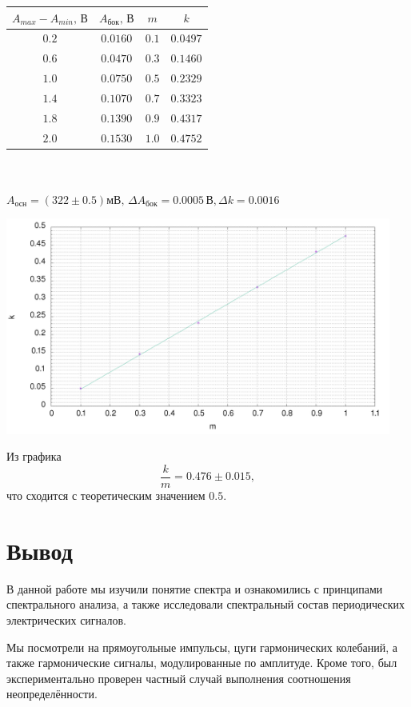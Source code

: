 \documentclass[a4paper, 12pt]{article}%
\begin{document}
\begin{center}
\begin{tabular}{|c|c|c|c|}\hline
$A_{max}-A_{min}\text{, В}$&$A_\text{бок}\text{, В}$&$m$&$k$\\\hline
$0.2$&$0.0160$&$0.1$&$0.0497$\\\hline
$0.6$&$0.0470$&$0.3$&$0.1460$\\\hline
$1.0$&$0.0750$&$0.5$&$0.2329$\\\hline
$1.4$&$0.1070$&$0.7$&$0.3323$\\\hline
$1.8$&$0.1390$&$0.9$&$0.4317$\\\hline
$2.0$&$0.1530$&$1.0$&$0.4752$\\\hline
\end{tabular}\\~\\
$A_\text{осн} = (322\pm0.5)\text{мВ},\,\Delta A_\text{бок}=0.0005\,\text{В},\Delta k=0.0016\,\text{}$
\end{center}
\begin{center}
\includegraphics[width=0.95\textwidth]{./res/plot2.png}
\end{center}
Из графика
$$\frac{k}{m} = 0.476\pm0.015,$$
что сходится с теоретическим значением $0.5$.

\section{Вывод}

В данной работе мы изучили понятие спектра и ознакомились с принципами спектрального анализа, а также исследовали спектральный состав периодических электрических сигналов. 

Мы посмотрели на прямоугольные импульсы, цуги гармонических колебаний, а также гармонические сигналы, модулированные по амплитуде. Кроме того, был экспериментально проверен частный случай выполнения соотношения неопределённости. 
\end{document}
